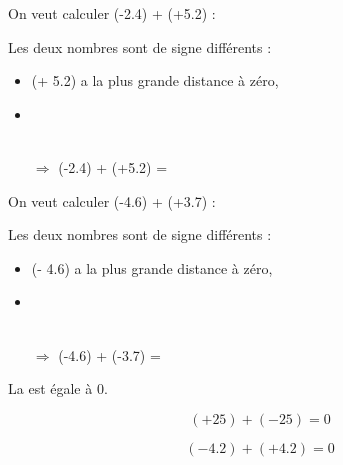 \begin{myexs}
		On veut calculer (-\num{2.4}) + (+\num{5.2}) :
		
		Les deux nombres sont de signe différents :
		\begin{itemize}
			\item (+ \num{5.2}) a la plus grande distance à zéro, %
			\item \ %
			\\ \ %
			\item[$\Rightarrow$] (-\num{2.4}) + (+\num{5.2}) = %
		\end{itemize} 
		
		\vspace*{1cm}
		
		On veut calculer (-\num{4.6}) + (+\num{3.7}) :
		
		Les deux nombres sont de signe différents :
		\begin{itemize}
			\item (- \num{4.6}) a la plus grande distance à zéro, %
			\item \ %
			\\ \ %
			\item[$\Rightarrow$] (-\num{4.6}) + (-\num{3.7}) = %
		\end{itemize} 
\end{myexs}



\begin{myprop}
	La  est égale à 0.
	
\end{myprop}

\begin{myexs}
	
	\begin{multicols}{2}
		\begin{equation*}
		(+ 25) + (-25) = 0
		\end{equation*}
		
		\begin{equation*}
		(- \num{4.2}) + (+ \num{4.2}) = 0
		\end{equation*}
	\end{multicols}
	
	
\end{myexs}

